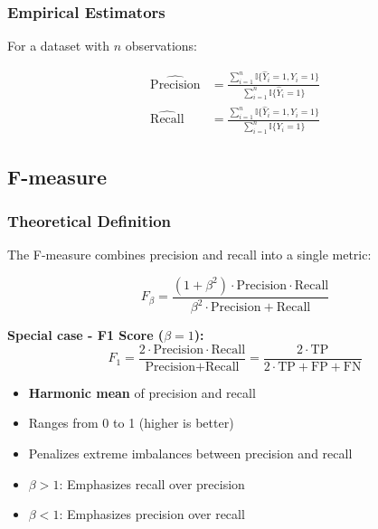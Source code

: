 \documentclass[12pt,a4paper]{article}
\begin{document}
\subsubsection{Empirical Estimators}

For a dataset with $n$ observations:

\begin{align}
\widehat{\text{Precision}} &= \frac{\sum_{i=1}^n \mathbb{I}\{\hat{Y}_i = 1, Y_i = 1\}}{\sum_{i=1}^n \mathbb{I}\{\hat{Y}_i = 1\}} \\
\widehat{\text{Recall}} &= \frac{\sum_{i=1}^n \mathbb{I}\{\hat{Y}_i = 1, Y_i = 1\}}{\sum_{i=1}^n \mathbb{I}\{Y_i = 1\}}
\end{align}

\subsection{F-measure}

\subsubsection{Theoretical Definition}

The F-measure combines precision and recall into a single metric:

\begin{equation}
F_\beta = \frac{(1 + \beta^2) \cdot \text{Precision} \cdot \text{Recall}}{\beta^2 \cdot \text{Precision} + \text{Recall}}
\end{equation}

\textbf{Special case - F1 Score ($\beta = 1$):}
\begin{equation}
F_1 = \frac{2 \cdot \text{Precision} \cdot \text{Recall}}{\text{Precision} + \text{Recall}} = \frac{2 \cdot \text{TP}}{2 \cdot \text{TP} + \text{FP} + \text{FN}}
\end{equation}

\begin{tcolorbox}[colback=blue!5!white,colframe=blue!75!black,title=F-measure Properties]
\begin{itemize}
    \item \textbf{Harmonic mean} of precision and recall
    \item Ranges from 0 to 1 (higher is better)
    \item Penalizes extreme imbalances between precision and recall
    \item $\beta > 1$: Emphasizes recall over precision
    \item $\beta < 1$: Emphasizes precision over recall
\end{itemize}
\end{tcolorbox}
\end{document}
